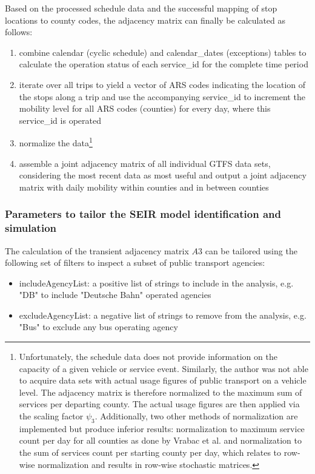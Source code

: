 Based on the processed schedule data and the successful mapping of stop locations to county codes, the adjacency matrix can finally be calculated as follows:

\begin{enumerate}
	\item combine calendar (cyclic schedule) and calendar\_dates (exceptions) tables to calculate the operation status of each service\_id for the complete time period
	\item iterate over all trips to yield a vector of ARS codes indicating the location of the stops along a trip and use the accompanying service\_id to increment the mobility level for all ARS codes (counties) for every day, where this service\_id is operated
	\item normalize the data\footnote{Unfortunately, the schedule data does not provide information on the capacity of a given vehicle or service event. Similarly, the author was not able to acquire data sets with actual usage figures of public transport on a vehicle level. The adjacency matrix is therefore normalized to the maximum sum of services per departing county. The actual usage figures are then applied via the scaling factor $\psi_3$. Additionally, two other methods of normalization are implemented but produce inferior results: normalization to maximum service count per day for all counties as done by Vrabac et al. and normalization to the sum of services count per starting county per day, which relates to row-wise normalization and results in row-wise stochastic matrices.}
	\item assemble a joint adjacency matrix of all individual GTFS data sets, considering the most recent data as most useful and output a joint adjacency matrix with daily mobility within counties and in between counties
\end{enumerate}

\subsubsection{Parameters to tailor the SEIR model identification and simulation}
The calculation of the transient adjacency matrix $A3$ can be tailored using the following set of filters to inspect a subset of public transport agencies:
\begin{itemize}
	\item includeAgencyList: a positive list of strings to include in the analysis, e.g. "DB" to include "Deutsche Bahn" operated agencies
	\item excludeAgencyList: a negative list of strings to remove from the analysis, e.g. "Bus" to exclude any bus operating agency
\end{itemize}

